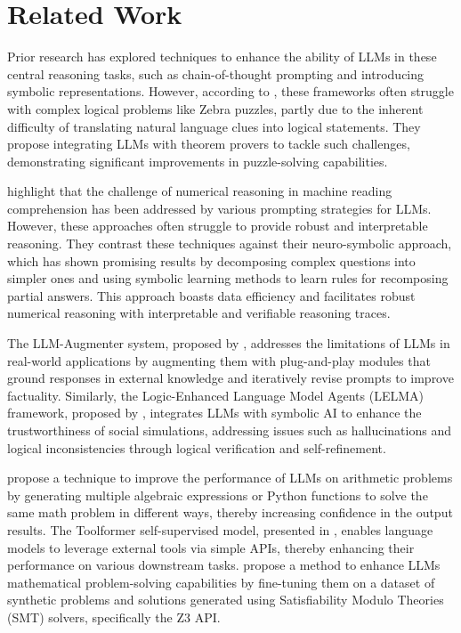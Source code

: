 \section{Related Work}
Prior research has explored techniques to enhance the ability of LLMs in these
central reasoning tasks, such as chain-of-thought prompting and introducing
symbolic representations. However, according to
\cite{berman2024solvingzebrapuzzlesusing}, these frameworks often struggle with
complex logical problems like Zebra puzzles, partly due to the inherent
difficulty of translating natural language clues into logical statements. They
propose integrating LLMs with theorem provers to tackle such challenges,
demonstrating significant improvements in puzzle-solving capabilities.

\cite{al-negheimish2023augmenting} highlight that the challenge of numerical
reasoning in machine reading comprehension has been addressed by various
prompting strategies for LLMs. However, these approaches often struggle to
provide robust and interpretable reasoning. They contrast these techniques
against their neuro-symbolic approach, which has shown promising results by
decomposing complex questions into simpler ones and using symbolic learning
methods to learn rules for recomposing partial answers. This approach boasts
data efficiency and facilitates robust numerical reasoning with interpretable
and verifiable reasoning traces.

The LLM-Augmenter system, proposed by \cite{peng2023checkfactstryagain},
addresses the limitations of LLMs in real-world applications by augmenting them
with plug-and-play modules that ground responses in external knowledge and
iteratively revise prompts to improve factuality. Similarly, the Logic-Enhanced
Language Model Agents (LELMA) framework, proposed by
\cite{mensfelt2024logicenhancedlanguagemodelagents}, integrates LLMs with
symbolic AI to enhance the trustworthiness of social simulations, addressing
issues such as hallucinations and logical inconsistencies through logical
verification and self-refinement.

\cite{imani2023mathpromptermathematicalreasoningusing} propose a technique to
improve the performance of LLMs on arithmetic problems by generating multiple
algebraic expressions or Python functions to solve the same math problem in
different ways, thereby increasing confidence in the output results. The
Toolformer self-supervised model, presented in
\cite{schick2023toolformerlanguagemodelsteach}, enables language models to
leverage external tools via simple APIs, thereby enhancing their performance on
various downstream tasks. \cite{fedoseev2024llm} propose a method to enhance
LLMs mathematical problem-solving capabilities by fine-tuning them on a dataset
of synthetic problems and solutions generated using Satisfiability Modulo
Theories (SMT) solvers, specifically the Z3 API.

